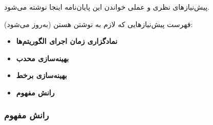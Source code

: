 \documentclass[a4paper,11px]{article}
\newcommand{\basepath}{../}
\begin{document}
پیش‌نیازهای نظری و عملی خواندن این پایان‌نامه اینجا نوشته می‌شود.


فهرست پیش‌نیازهایی که لازم به نوشتن هستن (به‌روز می‌شود):
\begin{itemize}
\item {\bf
نمادگزاری زمان اجرای الگوریتم‌ها
}


\item {\bf
بهینه‌سازی محدب
}

\item {\bf
بهینه‌سازی برخط
}

\item {\bf
رانش مفهوم
}

\end{itemize}



















\subsubsection{
رانش مفهوم
}
\end{document}
